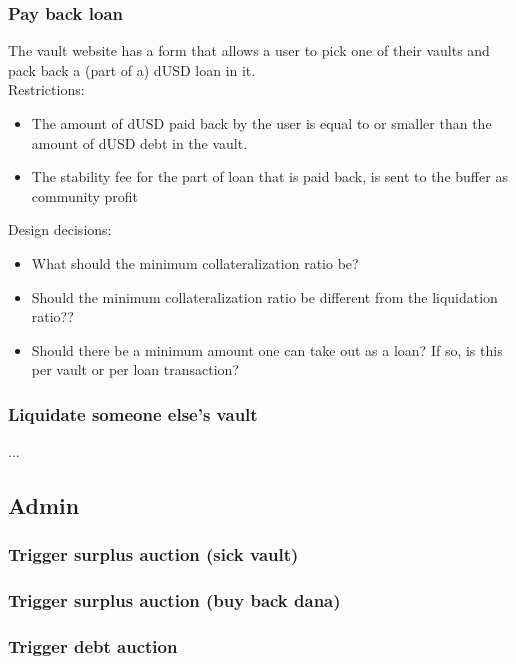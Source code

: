 \documentclass{article} %
\begin{document}
\subsubsection{Pay back loan}

The vault website has a form that allows a user to pick one of their vaults and
pack back a (part of a) dUSD loan in it. \\

Restrictions:
\begin{itemize}
  \item The amount of dUSD paid back by the user is equal to or smaller than the
    amount of dUSD debt in the vault.
  \item The stability fee for the part of loan that is paid back, is sent to the
    buffer as community profit
\end{itemize}

Design decisions:
\begin{itemize}
  \item What should the minimum collateralization ratio be?
  \item Should the minimum collateralization ratio be different from the
    liquidation ratio??
  \item Should there be a minimum amount one can take out as a loan? If so, is
    this per vault or per loan transaction?
\end{itemize}

\subsubsection{Liquidate someone else's vault}

...

\subsection{Admin}

\subsubsection{Trigger surplus auction (sick vault)}

\subsubsection{Trigger surplus auction (buy back dana)}

\subsubsection{Trigger debt auction}
\end{document}
